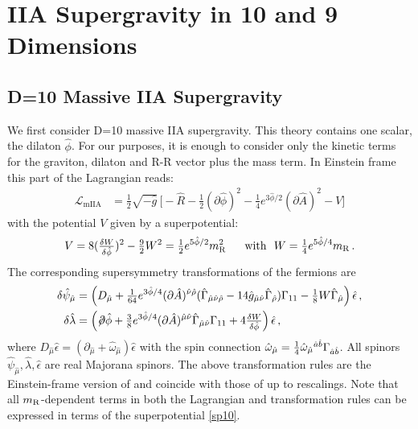 \documentclass[12pt,a4paper]{article}
\begin{document}
\section{IIA Supergravity in 10 and 9 Dimensions}

\subsection{D=10 Massive IIA Supergravity}


We first consider D=10 massive IIA supergravity. This theory
contains one scalar, the dilaton $\hat{\phi}$. For our purposes,
it is enough to consider only the kinetic terms for the graviton,
dilaton and R-R vector plus the mass term. In Einstein frame this
part of the Lagrangian reads:
\begin{align}
  \mathcal{L}_{\text{mIIA}}
  & = \tfrac{1}{2} \sqrt{-\hat{g}} \,
    \bigl[ -\hat{R} -\tfrac{1}{2} (\partial \hat{\phi})^2
    -\tfrac{1}{4} e^{3 \hat{\phi}/2} (\partial \hat A)^2 - V \bigr]
\label{mIIA}
\end{align}
with the potential $V$ given by a superpotential:
\begin{align}
  V = 8 (\tfrac{\delta W}{\delta \hat{\phi}})^2 - \tfrac{9}{2} W^2
    = \tfrac{1}{2} e^{5\hat{\phi}/2} m_{\rm R}^2 \text{~~~~ with~~}
  W = \tfrac{1}{4} e^{5\hat{\phi}/4} m_{\rm R} \, .
\end{align}
The corresponding supersymmetry transformations of the fermions are
\begin{equation}
\begin{aligned}
  \delta \hat{\psi}_{\hat{\mu}}
  & = \left (D_{\hat{\mu}} +\tfrac{1}{64} e^{3 \hat{\phi}/4} (\partial \hat A
)^{\hat{\nu} \hat{\rho}}
    (\hat{\Gamma}_{\hat{\mu} \hat{\nu} \hat{\rho}}
    - 14 \hat{g}_{\hat{\mu} \hat{\nu}} \hat{\Gamma}_{\hat{\rho}})
    \Gamma_{11} - \tfrac{1}{8} W \hat{\Gamma}_{\hat{\mu}}\right )
    \hat{\epsilon} \,, \\
  \delta \hat{\lambda} & = \left (
\not \! \partial \hat{\phi} +  \tfrac{3}{8} e^{3 \hat{\phi}/4}
    (\partial \hat A)^{\hat{\mu} \hat{\nu}} \hat{\Gamma}_{\hat{\mu}
\hat{\nu}} \Gamma_{11}
    + 4 \tfrac{\delta W}{\delta \hat{\phi}}\right )
    \hat{\epsilon} \,,
\end{aligned}
\label{susy10DmIIA}
\end{equation}
where $D_{\hat{\mu}}\hat\epsilon= (\partial_{\hat{\mu}}+
\hat{\omega}_{\hat \mu}) \hat\epsilon$ with the spin connection
$\hat{\omega}_{\hat \mu} = {\textstyle{1\over 4}}
\hat{\omega}_{\hat{\mu}}{}^{{\hat{a}} {\hat{b}}}
{\Gamma}_{{\hat{a}}{\hat{b}}}$. All spinors
$\hat{\psi}_{\hat{\mu}}, \hat{\lambda}, \hat{\epsilon}$ are real
Majorana spinors. The above transformation rules are the
Einstein-frame version of \cite{Bergshoeff:2001pv} and coincide
with those of \cite{Romans:1986tz} up to rescalings. Note that all
$m_{\rm R}$-dependent terms in both the Lagrangian and
transformation rules can be expressed in terms of the
superpotential \eqref{sp10}.
\end{document}
